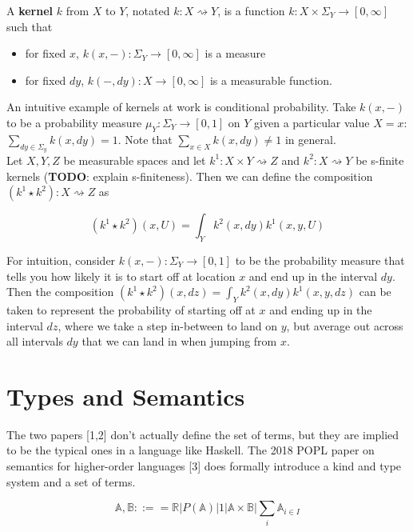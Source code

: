 \documentclass[11pt]{article}
\theoremstyle{definition}
\theoremstyle{plain}
\renewcommand{\b}[1]{\mathbb{#1}}
\begin{document}
A \textbf{kernel} $k$ from $X$ to $Y$, notated
$k: X \rightsquigarrow Y$, is a function $k: X \times \Sigma_Y \rightarrow [0,\infty]$
such that

\begin{itemize}
    \item for fixed $x$, $k(x,-): \Sigma_Y \rightarrow [0,\infty]$ is a measure
    \item for fixed $dy$, $k(-,dy): X \rightarrow [0,\infty]$ is a measurable function.
\end{itemize}

\noindent An intuitive example of kernels at work is conditional probability.
Take $k(x,-)$ to be a probability measure $\mu_Y: \Sigma_Y \rightarrow [0,1]$ on $Y$ given a particular value $X=x$:
$\sum_{dy \in \Sigma_y} k(x,dy) = 1$. Note that $\sum_{x \in X} k(x,dy) \neq 1$ in general.\\

\noindent Let $X,Y,Z$ be measurable spaces and let
$k^1 : X \times Y \rightsquigarrow Z$ and 
$k^2 : X \rightsquigarrow Y$ be s-finite kernels (\textbf{TODO}: explain s-finiteness). 
Then we can define the composition $(k^1 \star k^2) : X \rightsquigarrow Z$ as

$$ (k^1 \star k^2)(x,U) = \int_Y k^2(x,dy) k^1(x,y,U) $$

\noindent For intuition, consider $k(x,-): \Sigma_Y \rightarrow [0,1]$
to be the probability measure that tells you how likely it is to start
off at location $x$ and end up in the interval $dy$. Then the composition
$(k^1 \star k^2)(x,dz) = \int_Y k^2(x,dy) k^1(x,y,dz)$ can be taken to represent
the probability of starting off at $x$ and ending up in the interval $dz$, where
we take a step in-between to land on $y$, but average out across all intervals
$dy$ that we can land in when jumping from $x$.\\

\section{Types and Semantics}

\noindent The two papers [1,2] don't actually define the set of terms,
but they are implied to be the typical ones in a language like Haskell.
The 2018 POPL paper on semantics for higher-order languages [3] does formally
introduce a kind and type system and a set of terms.

$$ \b{A},\b{B} ::== 
    \b{R} | P(\b{A}) | 1 | \b{A} \times \b{B} | \sum_i \b{A}_{i \in I} $$
\end{document}
